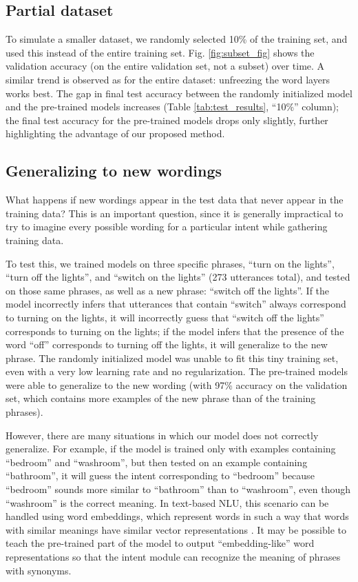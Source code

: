 \documentclass[a4paper]{article}
\begin{document}
\subsection{Partial dataset}
To simulate a smaller dataset, we randomly selected 10\% of the training set, and used this instead of the entire training set. Fig. \ref{fig:subset_fig} shows the validation accuracy (on the entire validation set, not a subset) over time. A similar trend is observed as for the entire dataset: unfreezing the word layers works best. The gap in final test accuracy between the randomly initialized model and the pre-trained models increases (Table \ref{tab:test_results}, ``10\%'' column); the final test accuracy for the pre-trained models drops only slightly, further highlighting the advantage of our proposed method.

\subsection{Generalizing to new wordings}
What happens if new wordings appear in the test data that never appear in the training data? This is an important question, since it is generally impractical to try to imagine every possible wording for a particular intent while gathering training data. 

To test this, we trained models on three specific phrases, ``turn on the lights'', ``turn off the lights'', and ``switch on the lights'' (273 utterances total), and tested on those same phrases, as well as a new phrase: ``switch off the lights''. If the model incorrectly infers that utterances that contain ``switch'' always correspond to turning on the lights, it will incorrectly guess that ``switch off the lights'' corresponds to turning on the lights; if the model infers that the presence of the word ``off'' corresponds to turning off the lights, it will generalize to the new phrase. The randomly initialized model was unable to fit this tiny training set, even with a very low learning rate and no regularization. The pre-trained models were able to generalize to the new wording (with 97\% accuracy on the validation set, which contains more examples of the new phrase than of the training phrases).

However, there are many situations in which our model does not correctly generalize. For example, if the model is trained only with examples containing ``bedroom'' and ``washroom'', but then tested on an example containing ``bathroom'', it will guess the intent corresponding to ``bedroom'' because ``bedroom'' sounds more similar to ``bathroom'' than to ``washroom'', even though ``washroom'' is the correct meaning. In text-based NLU, this scenario can be handled using word embeddings, which represent words in such a way that words with similar meanings have similar vector representations \cite{Mesnil2015, mikolov2013efficient}. It may be possible to teach the pre-trained part of the model to output ``embedding-like'' word representations so that the intent module can recognize the meaning of phrases with synonyms.
\end{document}
